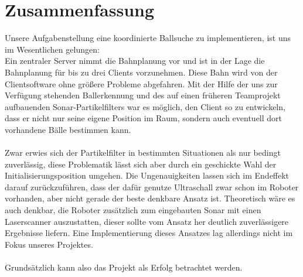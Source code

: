 
\chapter{Zusammenfassung}
\label{cha:zusammenfassung}
Unsere Aufgabenstellung eine koordinierte Ballsuche 
zu implementieren, ist uns im Wesentlichen gelungen:\\
Ein zentraler Server nimmt die Bahnplanung vor und ist in der Lage die
Bahnplanung für bis zu drei Clients vorzunehmen. Diese Bahn wird von
der Clientsoftware ohne größere Probleme abgefahren. Mit der Hilfe der
uns zur Verfügung stehenden Ballerkennung und des
auf einen früheren Teamprojekt aufbauenden Sonar-Partikelfilters war
es möglich, den Client so zu
entwickeln, dass er nicht nur seine eigene Position im Raum, sondern
auch eventuell dort vorhandene Bälle bestimmen kann. \\\\
Zwar erwies sich der Partikelfilter in bestimmten Situationen als nur
bedingt zuverlässig, diese Problematik lässt sich aber durch ein
geschickte Wahl der Initialisierungsposition umgehen. Die
Ungenauigkeiten lassen sich im Endeffekt darauf zurückzuführen, dass
der dafür genutze Ultraschall zwar schon im Roboter vorhanden, aber
nicht gerade der beste denkbare Ansatz ist. Theoretisch wäre
es auch denkbar, die Roboter zusätzlich zum eingebauten Sonar mit
einen Laserscanner auszustatten, dieser sollte vom Ansatz her deutlich
zuverlässigere Ergebnisse liefern. Eine Implementierung dieses
Ansatzes lag allerdings nicht im Fokus unseres Projektes. \\\\
Grundsätzlich kann also das Projekt als Erfolg betrachtet werden.

